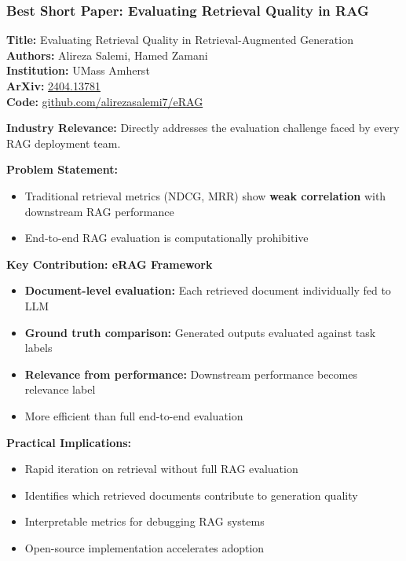 \documentclass[11pt,letterpaper]{article}
\begin{document}
\subsubsection{Best Short Paper: Evaluating Retrieval Quality in RAG}
\textbf{Title:} Evaluating Retrieval Quality in Retrieval-Augmented Generation\\
\textbf{Authors:} Alireza Salemi, Hamed Zamani\\
\textbf{Institution:} UMass Amherst\\
\textbf{ArXiv:} \href{https://arxiv.org/abs/2404.13781}{2404.13781}\\
\textbf{Code:} \href{https://github.com/alirezasalemi7/eRAG}{github.com/alirezasalemi7/eRAG}

\textbf{Industry Relevance:} Directly addresses the evaluation challenge faced by every RAG deployment team.

\textbf{Problem Statement:}
\begin{itemize}[leftmargin=*]
    \item Traditional retrieval metrics (NDCG, MRR) show \textbf{weak correlation} with downstream RAG performance
    \item End-to-end RAG evaluation is computationally prohibitive
\end{itemize}

\textbf{Key Contribution: eRAG Framework}
\begin{itemize}[leftmargin=*]
    \item \textbf{Document-level evaluation:} Each retrieved document individually fed to LLM
    \item \textbf{Ground truth comparison:} Generated outputs evaluated against task labels
    \item \textbf{Relevance from performance:} Downstream performance becomes relevance label
    \item More efficient than full end-to-end evaluation
\end{itemize}

\textbf{Practical Implications:}
\begin{itemize}[leftmargin=*]
    \item Rapid iteration on retrieval without full RAG evaluation
    \item Identifies which retrieved documents contribute to generation quality
    \item Interpretable metrics for debugging RAG systems
    \item Open-source implementation accelerates adoption
\end{itemize}
\end{document}
